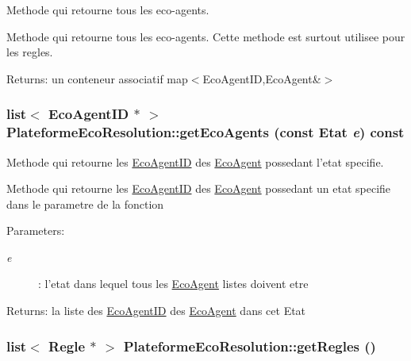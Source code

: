 Methode qui retourne tous les eco-agents. 

Methode qui retourne tous les eco-agents. Cette methode est surtout utilisee pour les regles.

\begin{Desc}
\item[Returns:]un conteneur associatif map$<$EcoAgentID,EcoAgent\&$>$ \end{Desc}
\hypertarget{classPlateformeEcoResolution_eccbbf85153147e551b9b6fa65f554e2}{
\subsubsection[{getEcoAgents}]{\setlength{\rightskip}{0pt plus 5cm}list$<$ {\bf EcoAgentID} $\ast$ $>$ PlateformeEcoResolution::getEcoAgents (const {\bf Etat} {\em e}) const}}
\label{classPlateformeEcoResolution_eccbbf85153147e551b9b6fa65f554e2}


Methode qui retourne les \hyperlink{classEcoAgentID}{EcoAgentID} des \hyperlink{classEcoAgent}{EcoAgent} possedant l'etat specifie. 

Methode qui retourne les \hyperlink{classEcoAgentID}{EcoAgentID} des \hyperlink{classEcoAgent}{EcoAgent} possedant un etat specifie dans le parametre de la fonction

\begin{Desc}
\item[Parameters:]
\begin{description}
\item[{\em e}]: l'etat dans lequel tous les \hyperlink{classEcoAgent}{EcoAgent} listes doivent etre \end{description}
\end{Desc}
\begin{Desc}
\item[Returns:]la liste des \hyperlink{classEcoAgentID}{EcoAgentID} des \hyperlink{classEcoAgent}{EcoAgent} dans cet Etat \end{Desc}
\hypertarget{classPlateformeEcoResolution_81dad57670e80ac2d29d02918b610636}{
\subsubsection[{getRegles}]{\setlength{\rightskip}{0pt plus 5cm}list$<$ {\bf Regle} $\ast$ $>$ PlateformeEcoResolution::getRegles ()}}
\label{classPlateformeEcoResolution_81dad57670e80ac2d29d02918b610636}



